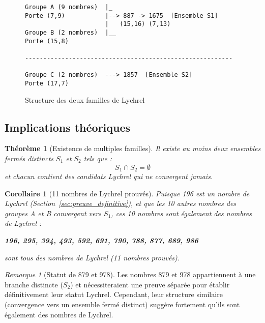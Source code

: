 \documentclass[12pt,a4paper]{article}
\newtheorem{theorem}{Théorème}[section]
\newtheorem{corollary}{Corollaire}[section]
\theoremstyle{remark}
\newtheorem{remark}{Remarque}[section]
\begin{document}
\begin{figure}[h]
\centering
\begin{verbatim}
Groupe A (9 nombres)  |_
Porte (7,9)           |--> 887 -> 1675  [Ensemble S1]
                      |   (15,16) (7,13)
Groupe B (2 nombres)  |__
Porte (15,8)

---------------------------------------------------------

Groupe C (2 nombres)  ---> 1857  [Ensemble S2]
Porte (17,7)
\end{verbatim}
\caption{Structure des deux familles de Lychrel}
\end{figure}

\subsection{Implications théoriques}

\begin{theorem}[Existence de multiples familles]
Il existe au moins deux ensembles fermés distincts $S_1$ et $S_2$ tels que :
\[
S_1 \cap S_2 = \emptyset
\]
et chacun contient des candidats Lychrel qui ne convergent jamais.
\end{theorem}

\begin{corollary}[11 nombres de Lychrel prouvés]
Puisque 196 est un nombre de Lychrel (Section~\ref{sec:preuve_definitive}), et que les 10 autres nombres des groupes A et B convergent vers $S_1$, ces 10 nombres sont également des nombres de Lychrel :

\begin{center}
\textbf{196, 295, 394, 493, 592, 691, 790, 788, 877, 689, 986}
\end{center}

sont tous des nombres de Lychrel (11 nombres prouvés).
\end{corollary}

\begin{remark}[Statut de 879 et 978]
Les nombres 879 et 978 appartiennent à une branche distincte ($S_2$) et nécessiteraient une preuve séparée pour établir définitivement leur statut Lychrel. Cependant, leur structure similaire (convergence vers un ensemble fermé distinct) suggère fortement qu'ils sont également des nombres de Lychrel.
\end{remark}

\end{document}
